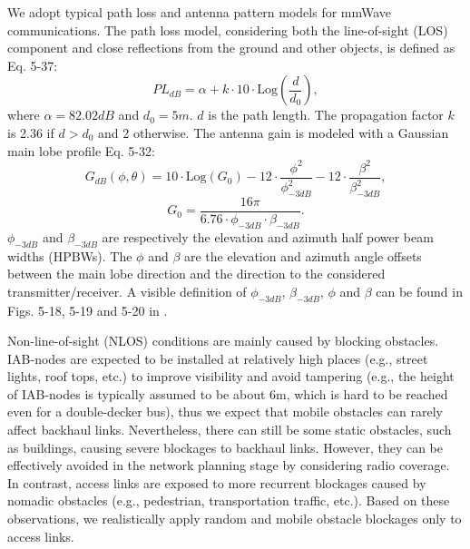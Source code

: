 We adopt typical path loss and antenna pattern models \cite{maltsev2014d5} for mmWave communications. The path loss model, considering both the line-of-sight (LOS) component and close reflections from the ground and other objects, is defined as \cite{maltsev2014d5} Eq. 5-37:
\begin{equation}
	PL_{dB} = \alpha + k\cdot10\cdot \text{Log}\left(\frac{d}{d_0}\right),
	\label{pathloss}
\end{equation}
where $\alpha=82.02dB$ and $d_0=5m$. $d$ is the path length. The propagation factor $k$ is 2.36 if $d > d_0$ and 2 otherwise.
The antenna gain is modeled with a Gaussian main lobe profile \cite{maltsev2014d5} Eq. 5-32:
\begin{equation}
	G_{dB}(\phi, \theta) = 10\cdot\text{Log}(G_0) - 12\cdot\frac{\phi^2}{\phi^2_{-3dB}} - 12\cdot\frac{\beta^2}{\beta^2_{-3dB}},
	\label{antenna_gain}
\end{equation}
\begin{equation}
	G_0 = \frac{16\pi}{6.76\cdot\phi_{-3dB}\cdot\beta_{-3dB}}.
 \label{base_antenna_gain}
\end{equation}
$\phi_{-3dB}$ and $\beta_{-3dB}$ are respectively the elevation and azimuth half power beam widths (HPBWs). The $\phi$ and $\beta$ are the elevation and azimuth angle offsets between the main lobe direction and the direction to the considered transmitter/receiver.
A visible definition of $\phi_{-3dB}$, $\beta_{-3dB}$, $\phi$ and $\beta$ can be found in Figs. 5-18, 5-19 and 5-20 in \cite{maltsev2014d5}.

Non-line-of-sight (NLOS) conditions are mainly caused by blocking obstacles. IAB-nodes are expected to be installed at relatively high places (e.g., street lights, roof tops, etc.) to improve visibility and avoid tampering (e.g., the height of IAB-nodes is typically assumed to be about $6$m, which is hard to be reached even for a double-decker bus), thus we expect that mobile obstacles can rarely affect backhaul links. Nevertheless, there can still be some static obstacles, such as buildings, causing severe blockages to backhaul links. However, they can be effectively avoided in the network planning stage by considering radio coverage.
In contrast, access links are exposed to more recurrent blockages caused by nomadic obstacles (e.g., pedestrian, transportation traffic, etc.). Based on these observations, we realistically apply random and mobile obstacle blockages only to access links.

